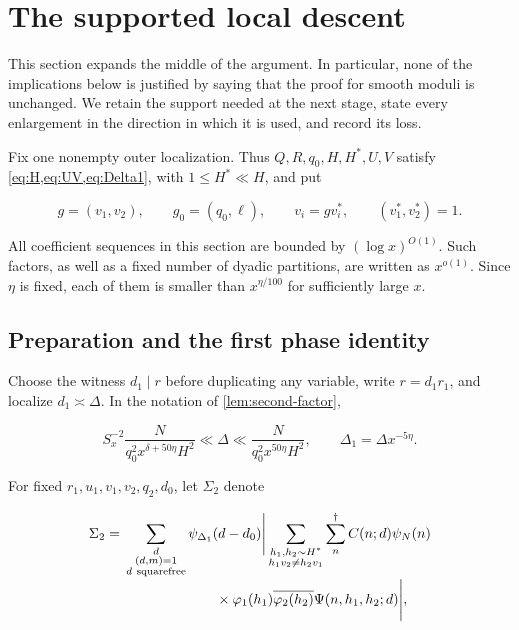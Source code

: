 \section{The supported local descent}
\label{sec:descent}

This section expands the middle of the argument.  In particular, none of the
implications below is justified by saying that the proof for smooth moduli is
unchanged.  We retain the support needed at the next stage, state every
enlargement in the direction in which it is used, and record its loss.

Fix one nonempty outer localization.  Thus $Q,R,q_0,H,H^*,U,V$ satisfy
\cref{eq:H,eq:UV,eq:Delta1}, with $1\le H^*\ll H$, and put

\begin{equation}\label{eq:g-g0}
 g=(v_1,v_2),\qquad g_0=(q_0,\ell),\qquad
 v_i=gv_i^*,\qquad (v_1^*,v_2^*)=1.
\end{equation}

All coefficient sequences in this section are bounded by
$(\log x)^{O(1)}$.  Such factors, as well as a fixed number of dyadic
partitions, are written as $x^{o(1)}$.  Since $\eta$ is fixed, each of them
is smaller than $x^{\eta/100}$ for sufficiently large $x$.

\subsection{Preparation and the first phase identity}

Choose the witness $d_1\mid r$ before duplicating any variable, write
$r=d_1r_1$, and localize $d_1\asymp\Delta$.  In the notation of
\cref{lem:second-factor},

\begin{equation}\label{eq:Delta-range-descent}
 S_x^{-2}\frac{N}{q_0^2x^{\delta+50\eta}H^2}
 \ll\Delta\ll
 \frac{N}{q_0^2x^{50\eta}H^2},
 \qquad \Delta_1=\Delta x^{-5\eta}.
\end{equation}

For fixed $r_1,u_1,v_1,v_2,q_2,d_0$, let $\Sigma_2$ denote

\begin{align}
\Sigma_2={}&
 \sum_{\substack{d\\(d,m)=1\\d\ {\rm squarefree}}}
 \psi_{\Delta_1}(d-d_0)
 \Bigg|
 \sum_{\substack{h_1,h_2\sim H^*\\h_1v_2\ne h_2v_1}}
 \sum_{n}^{\dagger}
 C(n;d)\psi_N(n)\notag\\[-1mm]
 &\hspace{23mm}\times
 \varphi_1(h_1)\overline{\varphi_2(h_2)}
 \Psi(n,h_1,h_2;d)
 \Bigg|,
 \label{eq:Sigma2}
\end{align}

